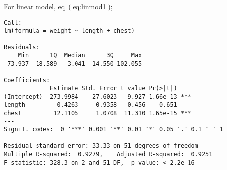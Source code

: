 \documentclass[a4paper,11pt]{article}
\begin{document}
For linear model, eq~(\ref{eq:linmod1});
{\footnotesize
    \begin{verbatim}
Call:
lm(formula = weight ~ length + chest)

Residuals:
    Min      1Q  Median      3Q     Max 
-73.937 -18.589  -3.041  14.550 102.055 

Coefficients:
             Estimate Std. Error t value Pr(>|t|)    
(Intercept) -273.9984    27.6023  -9.927 1.66e-13 ***
length         0.4263     0.9358   0.456    0.651    
chest         12.1105     1.0708  11.310 1.65e-15 ***
---
Signif. codes:  0 ‘***’ 0.001 ‘**’ 0.01 ‘*’ 0.05 ‘.’ 0.1 ‘ ’ 1

Residual standard error: 33.33 on 51 degrees of freedom
Multiple R-squared:  0.9279,    Adjusted R-squared:  0.9251 
F-statistic: 328.3 on 2 and 51 DF,  p-value: < 2.2e-16
 
    \end{verbatim}
}
\end{document}
